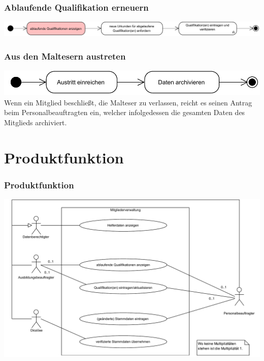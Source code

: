 \documentclass{beamer}
\begin{document}
\begin{frame}
\frametitle{Ablaufende Qualifikation erneuern}
\includegraphics[width=\textwidth]{PDF/BusinessP/Qualifikation_erneuern.pdf}
\end{frame}

\begin{frame}
\frametitle{Aus den Maltesern austreten}
\includegraphics[width=\textwidth]{PDF/BusinessP/Austreten.pdf}
\pause
Wenn ein Mitglied beschließt, die Malteser zu verlassen, reicht es seinen Antrag beim Personalbeauftragten ein, welcher infolgedessen die gesamten Daten des Mitglieds archiviert.
\end{frame}


\section{Produktfunktion}		
\begin{frame}
\frametitle{Produktfunktion}
\includegraphics[height=0.75 \textheight]{PDF/Use_Case.pdf}
\end{frame}
\end{document}
